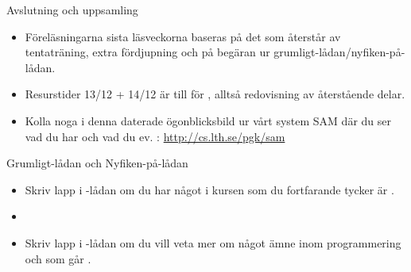 \begin{Slide}{Avslutning och uppsamling}
\begin{itemize}

\item Föreläsningarna sista läsveckorna baseras på det som återstår av tentaträning, extra fördjupning och på begäran ur grumligt-lådan/nyfiken-på-lådan.

\item Resurstider 13/12 + 14/12 är till för , alltså redovisning av återstående delar.
\item Kolla noga i denna daterade ögonblicksbild ur vårt system SAM där du ser vad du har  och vad du ev. : \url{http://cs.lth.se/pgk/sam}
\end{itemize}
\end{Slide}


\begin{Slide}{Grumligt-lådan och Nyfiken-på-lådan}
\begin{itemize}
\item Skriv lapp i -lådan om du har något  i kursen som du fortfarande tycker är .

\item[]

\item Skriv lapp i -lådan om du vill veta mer om något ämne inom programmering och som går .
\end{itemize}
\end{Slide}
